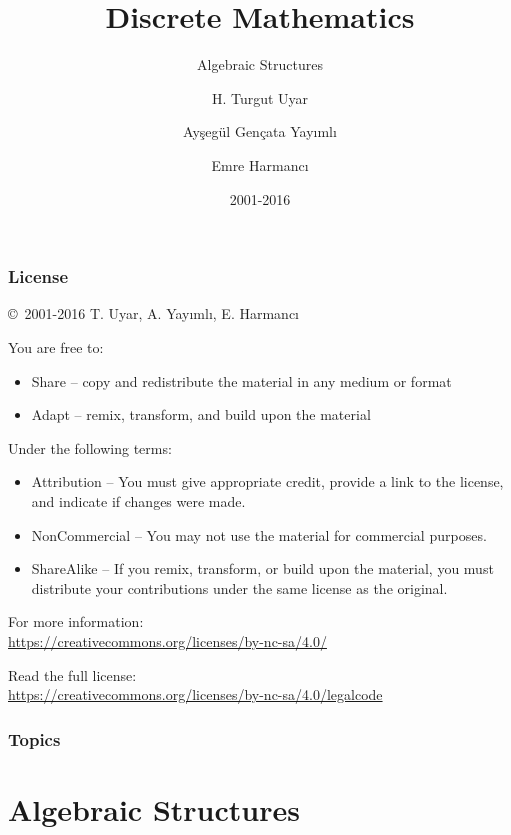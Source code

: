 \documentclass[dvipsnames]{beamer}
\title{Discrete Mathematics}
\subtitle{Algebraic Structures}
\author{H. Turgut Uyar \and Ayşegül Gençata Yayımlı \and Emre Harmancı}
\date{2001-2016}
\begin{document}
\begin{frame}
  \titlepage
\end{frame}

\begin{frame}
  \frametitle{License}

  \hfill
  \copyright~2001-2016 T. Uyar, A. Yayımlı, E. Harmancı

  \vfill
  \begin{footnotesize}
    You are free to:
    \begin{itemize}
      \itemsep0em
      \item Share -- copy and redistribute the material in any medium or format
      \item Adapt -- remix, transform, and build upon the material
    \end{itemize}

    Under the following terms:
    \begin{itemize}
      \itemsep0em
      \item Attribution -- You must give appropriate credit, provide a link to
        the license, and indicate if changes were made.

      \item NonCommercial -- You may not use the material for commercial
        purposes.

      \item ShareAlike -- If you remix, transform, or build upon the material,
        you must distribute your contributions under the same license as the
        original.
    \end{itemize}
  \end{footnotesize}

  \begin{small}
    For more information:\\
    \url{https://creativecommons.org/licenses/by-nc-sa/4.0/}

    \smallskip
    Read the full license:\\
    \url{https://creativecommons.org/licenses/by-nc-sa/4.0/legalcode}
  \end{small}
\end{frame}

\begin{frame}
  \frametitle{Topics}
  \tableofcontents
\end{frame}

\section{Algebraic Structures}
\end{document}
